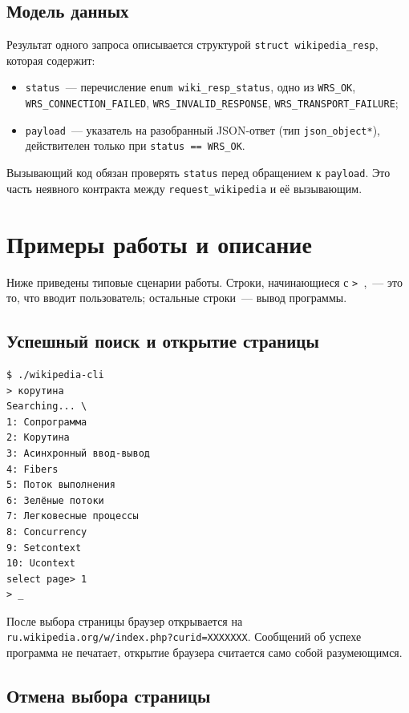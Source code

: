 \documentclass[12pt]{extarticle}
\renewcommand{\baselinestretch}{1.5}
\begin{document}
\subsection{Модель данных}

Результат одного запроса описывается структурой
\texttt{struct wikipedia\_resp}, которая содержит:

\begin{itemize}
    \item \texttt{status}~--- перечисление
          \texttt{enum wiki\_resp\_status}, одно из
          \texttt{WRS\_OK}, \texttt{WRS\_CONNECTION\_FAILED},
          \texttt{WRS\_INVALID\_RESPONSE},
          \texttt{WRS\_TRANSPORT\_FAILURE};
    \item \texttt{payload}~--- указатель на разобранный JSON-ответ
          (тип \texttt{json\_object*}), действителен только при
          \texttt{status == WRS\_OK}.
\end{itemize}

Вызывающий код обязан проверять \texttt{status} перед обращением
к \texttt{payload}. Это часть неявного контракта между
\texttt{request\_wikipedia} и её вызывающим.

\section{Примеры работы и описание}

Ниже приведены типовые сценарии работы. Строки, начинающиеся с
\texttt{>\ },~--- это то, что вводит пользователь; остальные
строки~--- вывод программы.

\subsection{Успешный поиск и открытие страницы}

\renewcommand{\baselinestretch}{1}
\begin{lstlisting}
$ ./wikipedia-cli
> корутина
Searching... \
1: Сопрограмма
2: Корутина
3: Асинхронный ввод-вывод
4: Fibers
5: Поток выполнения
6: Зелёные потоки
7: Легковесные процессы
8: Concurrency
9: Setcontext
10: Ucontext
select page> 1
> _
\end{lstlisting}
\renewcommand{\baselinestretch}{1.5}

После выбора страницы браузер открывается на
\texttt{ru.wikipedia.org/w/index.php?curid=XXXXXXX}. Сообщений об
успехе программа не печатает, открытие браузера считается
само собой разумеющимся.

\subsection{Отмена выбора страницы}
\end{document}
